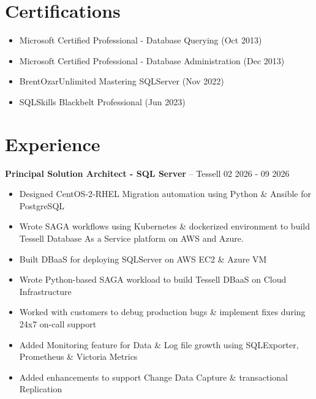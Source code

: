 \documentclass[10pt,a4paper]{article}
\begin{document}
\section{Certifications}
\begin{itemize}
\item Microsoft Certified Professional - Database Querying (Oct 2013)
\item Microsoft Certified Professional - Database Administration (Dec 2013)
\item BrentOzarUnlimited Mastering SQLServer (Nov 2022)
\item SQLSkills Blackbelt Professional (Jun 2023)
\end{itemize}

\section{Experience}

\textbf{Principal Solution Architect - SQL Server} -- Tessell \hfill 02 2026 - 09 2026
\begin{itemize}
  \item Designed CentOS-2-RHEL Migration automation using Python \& Ansible for PostgreSQL
  \item Wrote SAGA workflows using Kubernetes \& dockerized environment to build Tessell Database As a Service platform on AWS and Azure.
  \item Built DBaaS for deploying SQLServer on AWS EC2 \& Azure VM
  \item Wrote Python-based SAGA workload to build Tessell DBaaS on Cloud Infrastructure
  \item Worked with customers to debug production bugs \& implement fixes during 24x7 on-call support
  \item Added Monitoring feature for Data \& Log file growth using SQLExporter, Prometheus \& Victoria Metrics
  \item Added enhancements to support Change Data Capture \& transactional Replication
\end{itemize}
\end{document}
